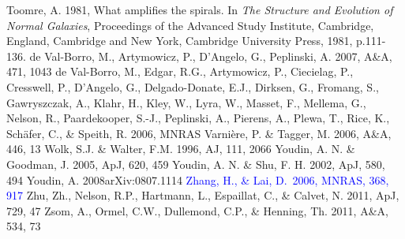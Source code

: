 \documentclass[apj]{emulateapj}
\def\blue#1{\textcolor{blue}{ #1}}
\begin{document}
\begin{thebibliography}{}
 Toomre, A. 1981, What amplifies the spirals. In {\it The Structure and Evolution of Normal Galaxies}, Proceedings of the Advanced Study Institute, Cambridge, England, Cambridge and New York, Cambridge University Press, 1981, p.111-136.
de Val-Borro, M., Artymowicz, P., D'Angelo, G., Peplinski, A. 2007, A\&A, 471, 1043
de Val-Borro, M., Edgar, R.G., Artymowicz, P., Ciecielag, P., Cresswell, P., D'Angelo, G., Delgado-Donate, E.J., Dirksen, G., Fromang, S., Gawryszczak, A., Klahr, H., Kley, W., Lyra, W., Masset, F., Mellema, G., Nelson, R., Paardekooper, S.-J., Peplinski, A., Pierens, A., Plewa, T., Rice, K., Sch\"afer, C., \& Speith, R. 2006, MNRAS
 Varni\`ere, P. \& Tagger, M. 2006, A\&A, 446, 13
 Wolk, S.J. \& Walter, F.M. 1996, AJ, 111, 2066
 Youdin, A. N. \& Goodman, J. 2005, ApJ, 620, 459
 Youdin, A. N. \& Shu, F. H. 2002, ApJ, 580, 494
 Youdin, A. 2008arXiv:0807.1114
\blue{ Zhang, H., \& Lai, D.\ 2006, MNRAS, 368, 917}
 Zhu, Zh., Nelson, R.P., Hartmann, L.,  Espaillat, C., \& Calvet, N. 2011, ApJ, 729, 47
 Zsom, A., Ormel, C.W., Dullemond, C.P., \& Henning, Th. 2011, A\&A, 534, 73
\end{thebibliography}
\end{document}
